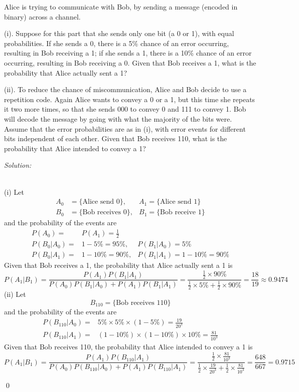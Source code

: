 \documentclass[12pt]{article}
\newenvironment{problem}[2][Problem]{\begin{trivlist}
\item[\hskip \labelsep {\bfseries #1}\hskip \labelsep {\bfseries #2.}]}{\end{trivlist}}
\newenvironment{sol}
    {\emph{Solution:}
    }
    {
    \qed
    }
\begin{document}
\begin{problem}{10}
Alice is trying to communicate with Bob, by sending a message (encoded in binary) across a channel.

(i). Suppose for this part that she sends only one bit (a 0 or 1), with equal probabilities. If she sends a 0, there is a 5\% chance of an error occurring, resulting in Bob receiving a 1; if she sends a 1, there is a 10\% chance of an error occurring, resulting in Bob receiving a 0. Given that Bob receives a 1, what is the probability that Alice actually sent a 1?

(ii). To reduce the chance of miscommunication, Alice and Bob decide to use a repetition code. Again Alice wants to convey a 0 or a 1, but this time she repeats it two more times, so that she sends 000 to convey 0 and 111 to convey 1. Bob will decode the message by going with what the majority of the bits were. Assume that the error probabilities are as in (i), with error events for different bits independent of each other. Given that Bob receives 110, what is the probability that Alice intended to convey a 1?
\end{problem}
\begin{sol}
\\(i) Let
\begin{align*}
A_0&=\{\text{Alice send }0\},&A_1=\{\text{Alice send }1\}\\
B_0&=\{\text{Bob receives }0\},&B_1=\{\text{Bob receive }1\}
\end{align*}
and the probability of the events are
\begin{align*}
P(A_0)=&P(A_1)=\frac{1}{2}\\
P(B_0|A_0)=&1-5\%=95\%,&P(B_1|A_0)=5\%\\
P(B_0|A_1)=&1-10\%=90\%,&P(B_1|A_1)=1-10\%=90\%
\end{align*}
Given that Bob receives a 1, the probability that Alice actually sent a 1 is
\[
P(A_1|B_1)=\frac{P(A_1)P(B_1|A_1)}{P(A_0)P(B_1|A_0)+P(A_1)P(B_1|A_1)}=\frac{\frac{1}{2}\times90\%}{\frac{1}{2}\times5\%+\frac{1}{2}\times90\%}=\frac{18}{19}\approx0.9474
\]
(ii) Let
\[
B_{110}=\{\text{Bob receives }110\}
\]
and the probability of the events are
\begin{align*}
P(B_{110}|A_0)=&5\%\times5\%\times(1-5\%)=\frac{19}{20^3}\\
P(B_{110}|A_1)=&(1-10\%)\times(1-10\%)\times10\%=\frac{81}{10^3}
\end{align*}
Given that Bob receives 110, the probability that Alice intended to convey a 1 is
\[
P(A_1|B_1)=\frac{P(A_1)P(B_{110}|A_1)}{P(A_0)P(B_{110}|A_0)+P(A_1)P(B_{110}|A_1)}=\frac{\frac{1}{2}\times\frac{81}{10^3}}{\frac{1}{2}\times\frac{19}{20^3}+\frac{1}{2}\times\frac{81}{10^3}}=\frac{648}{667}=0.9715
\]
\end{sol}

\end{document}
